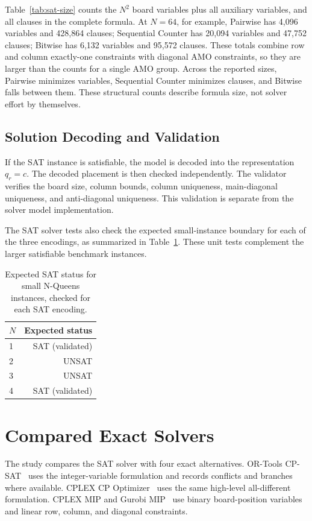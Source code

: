 \documentclass[a4paper,fleqn]{cas-sc}
\begin{document}
Table~\ref{tab:sat-size} counts the $N^2$ board variables plus all auxiliary variables, and all clauses in the complete formula. At $N=64$, for example, Pairwise has 4,096 variables and 428,864 clauses; Sequential Counter has 20,094 variables and 47,752 clauses; Bitwise has 6,132 variables and 95,572 clauses. These totals combine row and column exactly-one constraints with diagonal AMO constraints, so they are larger than the counts for a single AMO group. Across the reported sizes, Pairwise minimizes variables, Sequential Counter minimizes clauses, and Bitwise falls between them. These structural counts describe formula size, not solver effort by themselves.

\subsection{Solution Decoding and Validation}

If the SAT instance is satisfiable, the model is decoded into the representation $q_r=c$. The decoded placement is then checked independently. The validator verifies the board size, column bounds, column uniqueness, main-diagonal uniqueness, and anti-diagonal uniqueness. This validation is separate from the solver model implementation.

The SAT solver tests also check the expected small-instance boundary for each of the three encodings, as summarized in Table~\ref{tab:sat-boundary}. These unit tests complement the larger satisfiable benchmark instances.

\begin{table}[width=.55\linewidth,cols=2,pos=ht]
\caption{Expected SAT status for small N-Queens instances, checked for each SAT encoding.}
\label{tab:sat-boundary}
\begin{tabular}{lr}
\hline
$N$ & Expected status \\
\hline
1 & SAT (validated) \\
2 & UNSAT \\
3 & UNSAT \\
4 & SAT (validated) \\
\hline
\end{tabular}
\end{table}

\section{Compared Exact Solvers}

The study compares the SAT solver with four exact alternatives. OR-Tools CP-SAT~\citep{ortools} uses the integer-variable formulation and records conflicts and branches where available. CPLEX CP Optimizer~\citep{cplex} uses the same high-level all-different formulation. CPLEX MIP and Gurobi MIP~\citep{gurobi} use binary board-position variables and linear row, column, and diagonal constraints.
\end{document}
